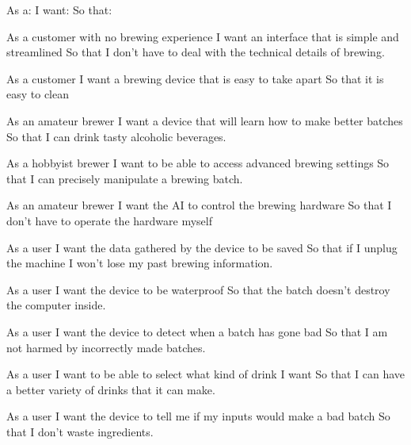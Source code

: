 
As a:
I want:
So that:

As a customer with no brewing experience 
I want an interface that is simple and streamlined
So that I don't have to deal with the technical details of brewing.

As a customer
I want a brewing device that is easy to take apart
So that it is easy to clean

As an amateur brewer
I want a device that will learn how to make better batches
So that I can drink tasty alcoholic beverages.

As a hobbyist brewer
I want to be able to access advanced brewing settings
So that I can precisely manipulate a brewing batch.

As an amateur brewer
I want the AI to control the brewing hardware
So that I don't have to operate the hardware myself

As a user
I want the data gathered by the device to be saved
So that if I unplug the machine I won't lose my past brewing information.

As a user
I want the device to be waterproof
So that the batch doesn't destroy the computer inside.

As a user
I want the device to detect when a batch has gone bad
So that I am not harmed by incorrectly made batches.

As a user
I want to be able to select what kind of drink I want
So that I can have a better variety of drinks that it can make.

As a user
I want the device to tell me if my inputs would make a bad batch
So that I don't waste ingredients.



